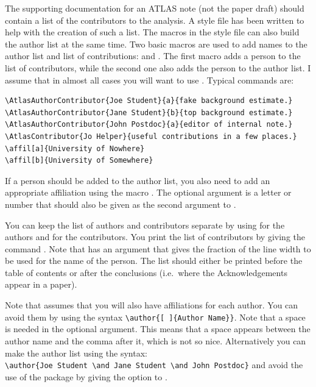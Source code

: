The supporting documentation for an ATLAS note (not the paper draft) should contain a list of the contributors to the analysis.
A style file  has been written to help with the creation of such a list.
The macros in the style file can also build the author list at the same time.
Two basic macros are used to add names to the author list and list of contributions:
 and . 
The first macro adds a person to the list of contributors, while the second one also adds the person
to the author list. I assume that in almost all cases you will want to use .
Typical commands are:
\begin{verbatim}
\AtlasAuthorContributor{Joe Student}{a}{fake background estimate.}
\AtlasAuthorContributor{Jane Student}{b}{top background estimate.}
\AtlasAuthorContributor{John Postdoc}{a}{editor of internal note.}
\AtlasContributor{Jo Helper}{useful contributions in a few places.}
\affil[a]{University of Nowhere}
\affil[b]{University of Somewhere}
\end{verbatim}
If a person should be added to the author list, you also need to add an appropriate affiliation using the macro .
The optional argument is a letter or number that should also be given as the second argument to
.

You can keep the list of authors and contributors separate
by using  for the authors and  for the contributors.
You print the list of contributors by giving the command .
Note that  has an argument that gives the fraction of the line width
to be used for the name of the person.
The list should either be printed before the table of contents or after the conclusions
(i.e.\ where the Acknowledgements appear in a paper).

Note that  assumes that you will also have affiliations for each author.
You can avoid them by using the syntax \verb|\author{[ ]{Author Name}}|.
Note that a space is needed in the optional argument.
This means that a space appears between the author name and the comma after it, which is not so nice.
Alternatively you can make the author list using the syntax:\\
\verb|\author{Joe Student \and Jane Student \and John Postdoc}| and avoid the use of the
 package by giving the option  to .

